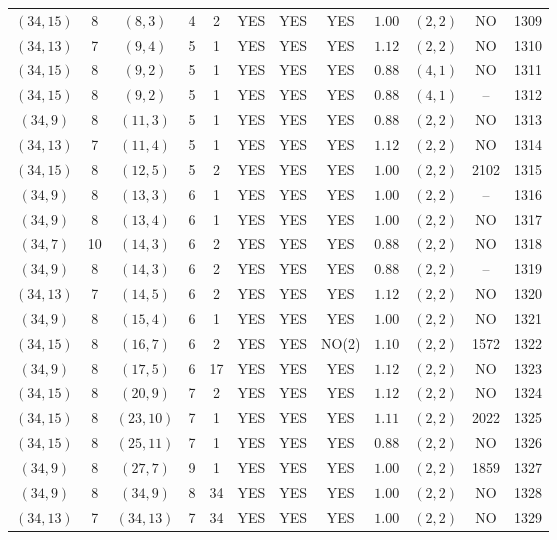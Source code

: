 \begin{longtable}{|c|c|c|c|c|c|c|c|c|c|c|c|}
$(34,15)$ & 8 & $(8,3)$ & 4 & 2 & YES & YES & YES & $1.00$ & $(2,2)$ & NO & 1309\\
$(34,13)$ & 7 & $(9,4)$ & 5 & 1 & YES & YES & YES & $1.12$ & $(2,2)$ & NO & 1310\\
$(34,15)$ & 8 & $(9,2)$ & 5 & 1 & YES & YES & YES & $0.88$ & $(4,1)$ & NO & 1311\\
$(34,15)$ & 8 & $(9,2)$ & 5 & 1 & YES & YES & YES & $0.88$ & $(4,1)$ & -- & 1312\\
$(34,9)$ & 8 & $(11,3)$ & 5 & 1 & YES & YES & YES & $0.88$ & $(2,2)$ & NO & 1313\\
$(34,13)$ & 7 & $(11,4)$ & 5 & 1 & YES & YES & YES & $1.12$ & $(2,2)$ & NO & 1314\\
$(34,15)$ & 8 & $(12,5)$ & 5 & 2 & YES & YES & YES & $1.00$ & $(2,2)$ & 2102 & 1315\\
$(34,9)$ & 8 & $(13,3)$ & 6 & 1 & YES & YES & YES & $1.00$ & $(2,2)$ & -- & 1316\\
$(34,9)$ & 8 & $(13,4)$ & 6 & 1 & YES & YES & YES & $1.00$ & $(2,2)$ & NO & 1317\\
$(34,7)$ & 10 & $(14,3)$ & 6 & 2 & YES & YES & YES & $0.88$ & $(2,2)$ & NO & 1318\\
$(34,9)$ & 8 & $(14,3)$ & 6 & 2 & YES & YES & YES & $0.88$ & $(2,2)$ & -- & 1319\\
$(34,13)$ & 7 & $(14,5)$ & 6 & 2 & YES & YES & YES & $1.12$ & $(2,2)$ & NO & 1320\\
$(34,9)$ & 8 & $(15,4)$ & 6 & 1 & YES & YES & YES & $1.00$ & $(2,2)$ & NO & 1321\\
$(34,15)$ & 8 & $(16,7)$ & 6 & 2 & YES & YES & NO(2) & $1.10$ & $(2,2)$ & 1572 & 1322\\
$(34,9)$ & 8 & $(17,5)$ & 6 & 17 & YES & YES & YES & $1.12$ & $(2,2)$ & NO & 1323\\
$(34,15)$ & 8 & $(20,9)$ & 7 & 2 & YES & YES & YES & $1.12$ & $(2,2)$ & NO & 1324\\
$(34,15)$ & 8 & $(23,10)$ & 7 & 1 & YES & YES & YES & $1.11$ & $(2,2)$ & 2022 & 1325\\
$(34,15)$ & 8 & $(25,11)$ & 7 & 1 & YES & YES & YES & $0.88$ & $(2,2)$ & NO & 1326\\
$(34,9)$ & 8 & $(27,7)$ & 9 & 1 & YES & YES & YES & $1.00$ & $(2,2)$ & 1859 & 1327\\
$(34,9)$ & 8 & $(34,9)$ & 8 & 34 & YES & YES & YES & $1.00$ & $(2,2)$ & NO & 1328\\
$(34,13)$ & 7 & $(34,13)$ & 7 & 34 & YES & YES & YES & $1.00$ & $(2,2)$ & NO & 1329\\

\end{longtable}
